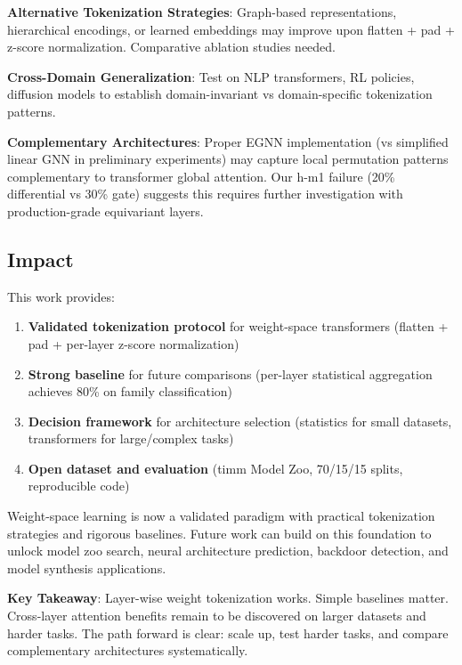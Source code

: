 \textbf{Alternative Tokenization Strategies}: Graph-based representations, hierarchical encodings, or learned embeddings may improve upon flatten + pad + z-score normalization. Comparative ablation studies needed.

\textbf{Cross-Domain Generalization}: Test on NLP transformers, RL policies, diffusion models to establish domain-invariant vs domain-specific tokenization patterns.

\textbf{Complementary Architectures}: Proper EGNN implementation (vs simplified linear GNN in preliminary experiments) may capture local permutation patterns complementary to transformer global attention. Our h-m1 failure (20\% differential vs 30\% gate) suggests this requires further investigation with production-grade equivariant layers.

\subsection{Impact}

This work provides:

\begin{enumerate}
\item \textbf{Validated tokenization protocol} for weight-space transformers (flatten + pad + per-layer z-score normalization)
\item \textbf{Strong baseline} for future comparisons (per-layer statistical aggregation achieves 80\% on family classification)
\item \textbf{Decision framework} for architecture selection (statistics for small datasets, transformers for large/complex tasks)
\item \textbf{Open dataset and evaluation} (timm Model Zoo, 70/15/15 splits, reproducible code)
\end{enumerate}

Weight-space learning is now a validated paradigm with practical tokenization strategies and rigorous baselines. Future work can build on this foundation to unlock model zoo search, neural architecture prediction, backdoor detection, and model synthesis applications.

\textbf{Key Takeaway}: Layer-wise weight tokenization works. Simple baselines matter. Cross-layer attention benefits remain to be discovered on larger datasets and harder tasks. The path forward is clear: scale up, test harder tasks, and compare complementary architectures systematically.
